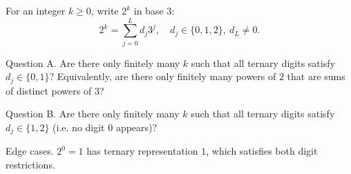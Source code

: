 For an integer $k\ge 0$, write $2^k$ in base $3$:
\[
2^k=\sum_{j=0}^L d_j 3^j,\quad d_j\in\{0,1,2\},\ d_L\ne 0.
\]

Question A.
Are there only finitely many $k$ such that all ternary digits satisfy $d_j\in\{0,1\}$?
Equivalently, are there only finitely many powers of $2$ that are sums of distinct powers of $3$?

Question B.
Are there only finitely many $k$ such that all ternary digits satisfy $d_j\in\{1,2\}$ (i.e. no digit $0$ appears)?

Edge cases.
$2^0=1$ has ternary representation $1$, which satisfies both digit restrictions.
